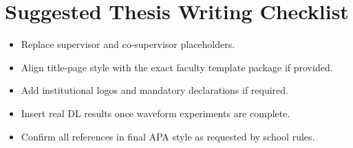 \documentclass[10pt,a4paper,twocolumn]{article}
\newcommand{\chapter}[1]{\section{#1}}
\begin{document}
\chapter{Suggested Thesis Writing Checklist}
\begin{itemize}[leftmargin=1.2cm]
    \item Replace supervisor and co-supervisor placeholders.
    \item Align title-page style with the exact faculty template package if provided.
    \item Add institutional logos and mandatory declarations if required.
    \item Insert real DL results once waveform experiments are complete.
    \item Confirm all references in final APA style as requested by school rules.
\end{itemize}





\end{document}
